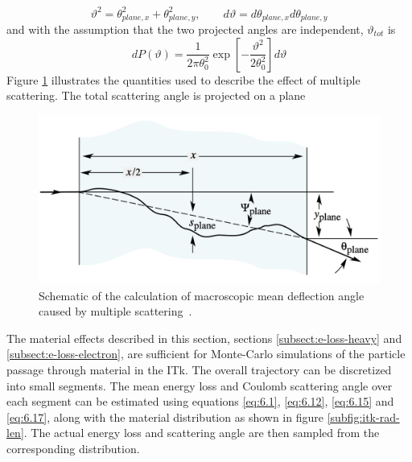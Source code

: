 \begin{equation}
\label{eq:6.16}
\vartheta^2 = \theta_{plane,x}^2 + \theta_{plane,y}^2, \quad\quad d\vartheta = d\theta_{plane,x}d\theta_{plane,y}
\end{equation}
and with the assumption that the two projected angles are independent, $\vartheta_{tot}$ is 
\begin{equation}
\label{eq:6.17}
d P(\vartheta) = \frac{1}{2\pi \theta_0^2} \exp \left[ - \frac{\vartheta^2}{2\theta_0^2} \right] d\vartheta
\end{equation}
Figure \ref{fig:multi-scat} illustrates the quantities used to describe the effect of multiple scattering. The total scattering angle is projected on a plane 

\begin{figure}[h!]
    \centering
    \includegraphics[width=0.65\linewidth]{figures/multi-scat.png}
    \caption{Schematic of the calculation of macroscopic mean deflection angle caused by multiple scattering~\cite{Zyla:2020zbs}.}
    \label{fig:multi-scat}
\end{figure}

The material effects described in this section, sections \ref{subsect:e-loss-heavy} and \ref{subsect:e-loss-electron}, are sufficient for Monte-Carlo simulations of the particle passage through material in the ITk. 
The overall trajectory can be discretized into small segments. 
The mean energy loss and Coulomb scattering angle over each segment can be estimated using equations \eqref{eq:6.1}, \eqref{eq:6.12}, \eqref{eq:6.15} and \eqref{eq:6.17}, along with the material distribution as shown in figure \ref{subfig:itk-rad-len}. The actual energy loss and scattering angle are then sampled from the corresponding distribution. 

